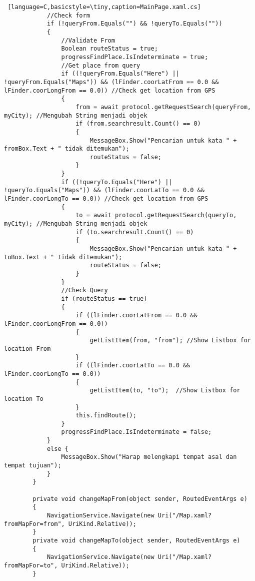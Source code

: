 \begin{lstlisting} [language=C,basicstyle=\tiny,caption=MainPage.xaml.cs]
            //Check form
            if (!queryFrom.Equals("") && !queryTo.Equals(""))
            {
                //Validate From
                Boolean routeStatus = true;
                progressFindPlace.IsIndeterminate = true;
                //Get place from query
                if ((!queryFrom.Equals("Here") || !queryFrom.Equals("Maps")) && (lFinder.coorLatFrom == 0.0 && lFinder.coorLongFrom == 0.0)) //Check get location from GPS
                {
                    from = await protocol.getRequestSearch(queryFrom, myCity); //Mengubah String menjadi objek
                    if (from.searchresult.Count() == 0)
                    {
                        MessageBox.Show("Pencarian untuk kata " + fromBox.Text + " tidak ditemukan");
                        routeStatus = false;
                    }
                }
                if ((!queryTo.Equals("Here") || !queryTo.Equals("Maps")) && (lFinder.coorLatTo == 0.0 && lFinder.coorLongTo == 0.0)) //Check get location from GPS
                {
                    to = await protocol.getRequestSearch(queryTo, myCity); //Mengubah String menjadi objek
                    if (to.searchresult.Count() == 0)
                    {
                        MessageBox.Show("Pencarian untuk kata " + toBox.Text + " tidak ditemukan");
                        routeStatus = false;
                    }
                }
                //Check Query
                if (routeStatus == true)
                {
                    if ((lFinder.coorLatFrom == 0.0 && lFinder.coorLongFrom == 0.0))
                    {
                        getListItem(from, "from"); //Show Listbox for location From
                    }
                    if ((lFinder.coorLatTo == 0.0 && lFinder.coorLongTo == 0.0))
                    {
                        getListItem(to, "to");  //Show Listbox for location To
                    }
                    this.findRoute();
                }
                progressFindPlace.IsIndeterminate = false;
            }
            else {
                MessageBox.Show("Harap melengkapi tempat asal dan tempat tujuan");
            }
        }

        private void changeMapFrom(object sender, RoutedEventArgs e)
        {
            NavigationService.Navigate(new Uri("/Map.xaml?fromMapFor=from", UriKind.Relative));
        }
        private void changeMapTo(object sender, RoutedEventArgs e)
        {
            NavigationService.Navigate(new Uri("/Map.xaml?fromMapFor=to", UriKind.Relative));    
        }


\end{lstlisting}
